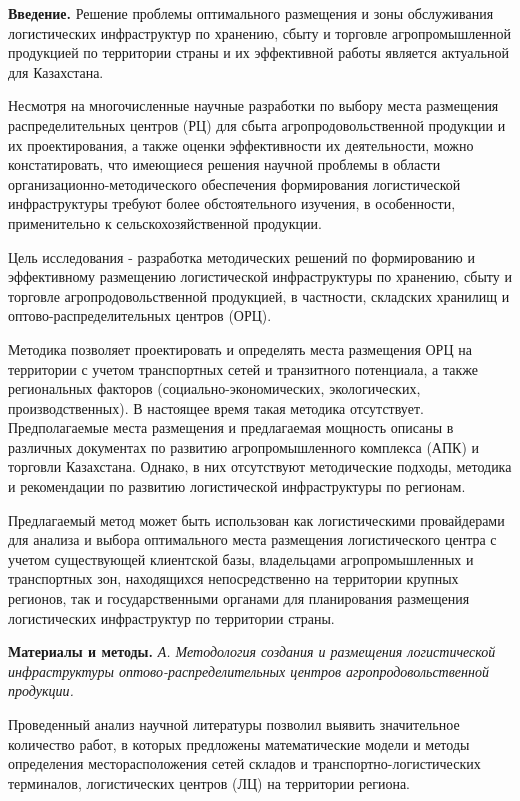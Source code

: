 \begin{multicols}{2}
{\bfseries Введение.} Решение проблемы оптимального размещения и зоны
обслуживания логистических инфраструктур по хранению, сбыту и торговле
агропромышленной продукцией по территории страны и их эффективной работы
является актуальной для Казахстана.

Несмотря на многочисленные научные разработки по выбору места размещения
распределительных центров (РЦ) для сбыта агропродовольственной продукции
и их проектирования, а также оценки эффективности их деятельности, можно
констатировать, что имеющиеся решения научной проблемы в области
организационно-методического обеспечения формирования логистической
инфраструктуры требуют более обстоятельного изучения, в особенности,
применительно к сельскохозяйственной продукции.

Цель исследования - разработка методических решений по
формированию и эффективному размещению логистической инфраструктуры по
хранению, сбыту и торговле агропродовольственной продукцией, в
частности, складских хранилищ и оптово-распределительных центров (ОРЦ).

Методика позволяет проектировать и определять места размещения ОРЦ на
территории с учетом транспортных сетей и транзитного потенциала, а также
региональных факторов (социально-экономических, экологических,
производственных). В настоящее время такая методика отсутствует.
Предполагаемые места размещения и предлагаемая мощность описаны в
различных документах по развитию агропромышленного комплекса (АПК) и
торговли Казахстана. Однако, в них отсутствуют методические подходы,
методика и рекомендации по развитию логистической инфраструктуры по
регионам.

Предлагаемый метод может быть использован как логистическими
провайдерами для анализа и выбора оптимального места размещения
логистического центра с учетом существующей клиентской базы, владельцами
агропромышленных и транспортных зон, находящихся непосредственно на
территории крупных регионов, так и государственными органами для
планирования размещения логистических инфраструктур по территории
страны.

{\bfseries Материалы и методы.} \emph{А. Методология создания и размещения
логистической инфраструктуры оптово-распределительных центров
агропродовольственной продукции.}

Проведенный анализ научной литературы позволил выявить значительное
количество работ, в которых предложены математические модели и методы
определения месторасположения сетей складов и транспортно-логистических
терминалов, логистических центров (ЛЦ) на территории региона.


\end{multicols}
